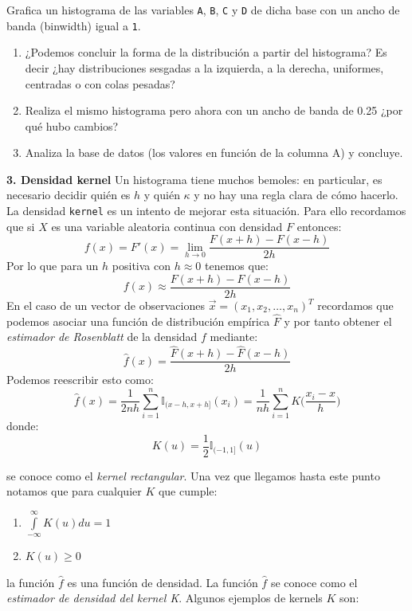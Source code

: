 \documentclass[
]{book}
\begin{document}
Grafica un histograma de las variables \texttt{A}, \texttt{B}, \texttt{C} y \texttt{D} de dicha base con un ancho de banda (binwidth) igual a \texttt{1}.

\begin{enumerate}
\def\labelenumi{\alph{enumi}.}
\item
  ¿Podemos concluir la forma de la distribución a partir del histograma? Es decir ¿hay distribuciones sesgadas a la izquierda, a la derecha, uniformes, centradas o con colas pesadas?
\item
  Realiza el mismo histograma pero ahora con un ancho de banda de 0.25 ¿por qué hubo cambios?
\item
  Analiza la base de datos (los valores en función de la columna A) y concluye.
\end{enumerate}

\textbf{3. Densidad kernel}
Un histograma tiene muchos bemoles: en particular, es necesario decidir quién es \(h\) y quién \(\kappa\) y no hay una regla clara de cómo hacerlo. La densidad \texttt{kernel} es un intento de mejorar esta situación. Para ello recordamos que si \(X\) es una variable aleatoria continua con densidad \(F\) entonces:
\[
f(x) = F'(x) = \lim_{h \to 0} \dfrac{F(x + h) - F(x - h)}{2h}
\]
Por lo que para un \(h\) positiva con \(h \approx 0\) tenemos que:
\[
f(x) \approx \dfrac{F(x + h) - F(x - h)}{2h} 
\]
En el caso de un vector de observaciones \(\vec{x} = (x_1, x_2, \dots, x_n)^T\) recordamos que podemos asociar una función de distribución empírica \(\hat{F}\) y por tanto obtener el \emph{estimador de Rosenblatt} de la densidad \(f\) mediante:
\[
\hat{f}(x) =  \dfrac{\hat{F}(x + h) -\hat{F}(x - h)}{2h} 
\]
Podemos reescribir esto como:
\[
\hat{f}(x) =  \dfrac{1}{2nh} \sum\limits_{i = 1}^n \mathbb{I}_{(x-h, x+h]}(x_i) = \dfrac{1}{nh}\sum\limits_{i = 1}^n K\Big( \frac{x_i - x}{h}\Big)
\]
donde:
\[
K(u) = \frac{1}{2} \mathbb{I}_{(-1, 1]}(u)
\]

se conoce como el \emph{kernel rectangular}. Una vez que llegamos hasta este punto notamos que para cualquier \(K\) que cumple:

\begin{enumerate}
\def\labelenumi{\arabic{enumi}.}
\item
  \(\int\limits_{-\infty}^{\infty} K(u) du = 1\)
\item
  \(K(u) \geq 0\)
\end{enumerate}

la función \(\hat{f}\) es una función de densidad. La función \(\hat{f}\) se conoce como el \emph{estimador de densidad del kernel K}. Algunos ejemplos de kernels \(K\) son:
\end{document}
